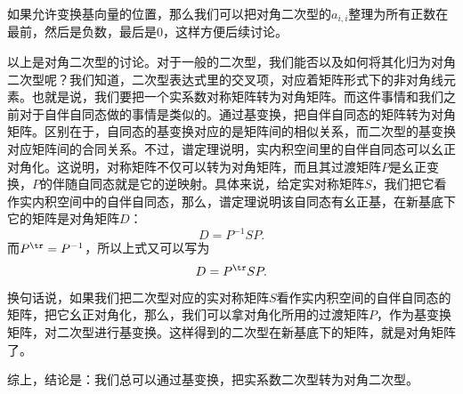\documentclass[12pt,UTF8,fontset=none]{ctexbook}
\begin{document}
如果允许变换基向量的位置，那么我们可以把对角二次型的$a_{i,i}$整理为所有正数在最前，然后是负数，最后是$0$，这样方便后续讨论。

以上是对角二次型的讨论。对于一般的二次型，我们能否以及如何将其化归为对角二次型呢？我们知道，二次型表达式里的交叉项，对应着矩阵形式下的非对角线元素。也就是说，我们要把一个实系数对称矩阵转为对角矩阵。而这件事情和我们之前对于自伴自同态做的事情是类似的。通过基变换，把自伴自同态的矩阵转为对角矩阵。区别在于，自同态的基变换对应的是矩阵间的相似关系，而二次型的基变换对应矩阵间的合同关系。不过，谱定理说明，实内积空间里的自伴自同态可以幺正对角化。这说明，对称矩阵不仅可以转为对角矩阵，而且其过渡矩阵$P$是幺正变换，$P$的伴随自同态就是它的逆映射。具体来说，给定实对称矩阵$S$，我们把它看作实内积空间中的自伴自同态，那么，谱定理说明该自同态有幺正基，在新基底下它的矩阵是对角矩阵$D$：
$$ D = P^{-1} S P.$$
而$P^{\tr} = P^{-1}$，所以上式又可以写为
$$ D = P^{\tr} S P.$$
换句话说，如果我们把二次型对应的实对称矩阵$S$看作实内积空间的自伴自同态的矩阵，把它幺正对角化，那么，我们可以拿对角化所用的过渡矩阵$P$，作为基变换矩阵，对二次型进行基变换。这样得到的二次型在新基底下的矩阵，就是对角矩阵了。

综上，结论是：我们总可以通过基变换，把实系数二次型转为对角二次型。
\end{document}
